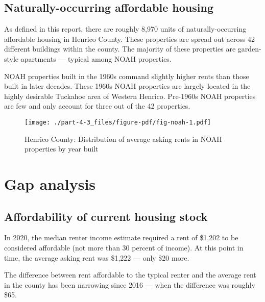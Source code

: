 \documentclass[
  letterpaper,
  DIV=11,
  numbers=noendperiod]{scrreprt}
\begin{document}
\hypertarget{naturally-occurring-affordable-housing-3}{%
\subsection{Naturally-occurring affordable
housing}\label{naturally-occurring-affordable-housing-3}}

As defined in this report, there are roughly 8,970 units of
naturally-occurring affordable housing in Henrico County. These
properties are spread out across 42 different buildings within the
county. The majority of these properties are garden-style apartments ---
typical among NOAH properties.

NOAH properties built in the 1960s command slightly higher rents than
those built in later decades. These 1960s NOAH properties are largely
located in the highly desirable Tuckahoe area of Western Henrico.
Pre-1960s NOAH properties are few and only account for three out of the
42 properties.

\begin{figure}

{\centering \texttt{[image: ./part-4-3\_files/figure-pdf/fig-noah-1.pdf]}

}

\caption{\label{fig-noah}Henrico County: Distribution of average asking
rents in NOAH properties by year built}

\end{figure}

\hypertarget{gap-analysis-2}{%
\section{Gap analysis}\label{gap-analysis-2}}

\hypertarget{affordability-of-current-housing-stock-2}{%
\subsection{Affordability of current housing
stock}\label{affordability-of-current-housing-stock-2}}

In 2020, the median renter income estimate required a rent of \$1,202 to
be considered affordable (not more than 30 percent of income). At this
point in time, the average asking rent was \$1,222 --- only \$20 more.

The difference between rent affordable to the typical renter and the
average rent in the county has been narrowing since 2016 --- when the
difference was roughly \$65.
\end{document}
